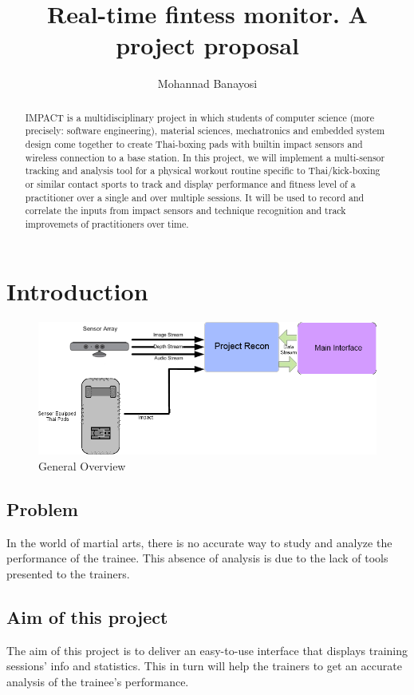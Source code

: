 \documentclass[a4paper]{article}
\author{Mohannad Banayosi}
\title{Real-time fintess monitor. A project proposal}
\begin{document}
\maketitle

\begin{abstract}
IMPACT is a multidisciplinary project in which students of computer science (more precisely: software engineering), material sciences, mechatronics and embedded system design come together to create Thai-boxing pads with builtin impact sensors and wireless connection to a base station.
In this project, we will implement a multi-sensor tracking and analysis tool for a physical workout routine specific to Thai/kick-boxing or similar contact sports to track and display performance and fitness level of a practitioner over a single and over multiple sessions. It will be used to record and correlate the inputs from impact sensors and technique recognition and track improvemets of practitioners over time.
  
\end{abstract}

\newpage

\section{Introduction}
\begin{figure}[h!]
\centering
\includegraphics[scale=0.6]{General.png}
\caption{General Overview}
\label{threadsVsSync}
\end{figure}

\subsection{Problem}
In the world of martial arts, there is no accurate way to study and analyze the performance of the trainee. This absence of analysis is due to the lack of tools presented to the trainers.

\subsection{Aim of this project}
The aim of this project is to deliver an easy-to-use interface that displays training sessions' info and statistics. This in turn will help the trainers to get an accurate analysis of the trainee's performance.
\end{document}

